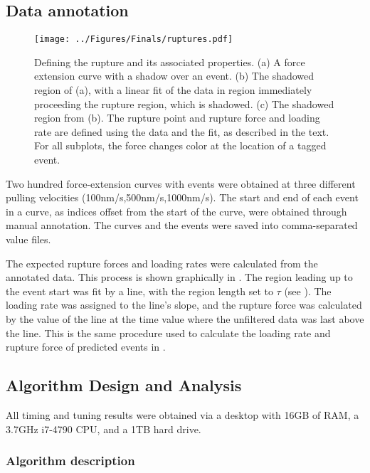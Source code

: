 \subsection{Data annotation}


\begin{figure}
\centering
\texttt{[image: ../Figures/Finals/ruptures.pdf]}%
\caption[Definition of rupture force and loading rate]{ Defining the rupture and its associated properties. (a) A force extension curve with a shadow over an event. (b) The shadowed region of (a), with a linear fit of the data in region immediately proceeding the rupture region, which is shadowed. (c) The shadowed region from (b). The rupture point and rupture force and loading rate are defined using the data and the fit, as described in the text. For all subplots, the force changes color at the location of a tagged event. }
\end{figure}

\firstp Two hundred force-extension curves with events were obtained at three different pulling velocities (100nm/s,500nm/s,1000nm/s). The start and end of each event in a curve, as indices offset from the start of the curve, were obtained through manual annotation. The curves and the events were saved into comma-separated value files. \pl

The expected rupture forces and loading rates were calculated from the annotated data. This process is shown graphically in . The region leading up to the event start was fit by a line, with the region length set to $\tau$ (see ). The loading rate was assigned to the line's slope, and the rupture force was calculated by the value of the line at the time value where the unfiltered data was last above the line. This is the same procedure used to calculate the loading rate and rupture force of predicted events in . \pl



\subsection{Algorithm Design and Analysis}

All timing and tuning results were obtained via a desktop with 16GB of RAM, a 3.7GHz i7-4790 CPU, and a 1TB hard drive. \pl

\subsubsection{Algorithm description}

